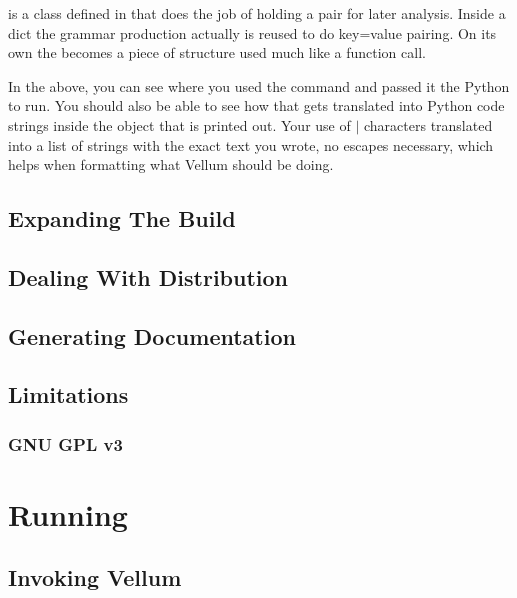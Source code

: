  is a class defined in  that does
the job of holding a  pair for later analysis.  Inside a
dict the  grammar production actually is reused to do key=value
pairing.  On its own the  becomes a piece of structure used much
like a function call.

In the above, you can see where you used the  command and passed it
the Python to run.  You should also be able to see how that gets translated into
Python code strings inside the  object that is printed out.
Your use of $|$ characters translated into a list of strings with the exact text
you wrote, no escapes necessary, which helps when formatting what Vellum should
be doing.


\section{Expanding The Build}




\section{Dealing With Distribution}




\section{Generating Documentation}




\section{Limitations}




\subsection{GNU GPL v3}



\chapter{Running}
\label{chapter:Running}



\section{Invoking Vellum}


